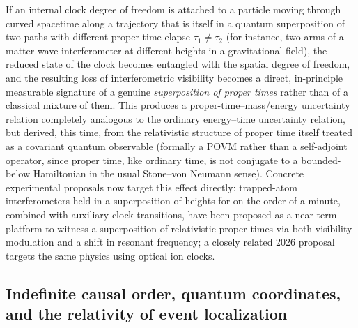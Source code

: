 \documentclass[11pt]{article}
\begin{document}
If an internal clock degree of freedom is attached to a particle moving through curved spacetime along a trajectory that is itself in a quantum superposition of two paths with different proper-time elapse $\tau_1\ne\tau_2$ (for instance, two arms of a matter-wave interferometer at different heights in a gravitational field), the reduced state of the clock becomes entangled with the spatial degree of freedom, and the resulting loss of interferometric visibility becomes a direct, in-principle measurable signature of a genuine \emph{superposition of proper times} rather than of a classical mixture of them. This produces a proper-time--mass/energy uncertainty relation completely analogous to the ordinary energy--time uncertainty relation, but derived, this time, from the relativistic structure of proper time itself treated as a covariant quantum observable (formally a POVM rather than a self-adjoint operator, since proper time, like ordinary time, is not conjugate to a bounded-below Hamiltonian in the usual Stone--von Neumann sense). Concrete experimental proposals now target this effect directly: trapped-atom interferometers held in a superposition of heights for on the order of a minute, combined with auxiliary clock transitions, have been proposed as a near-term platform to witness a superposition of relativistic proper times via both visibility modulation and a shift in resonant frequency; a closely related 2026 proposal targets the same physics using optical ion clocks.

\subsection{Indefinite causal order, quantum coordinates, and the relativity of event localization}
\end{document}

